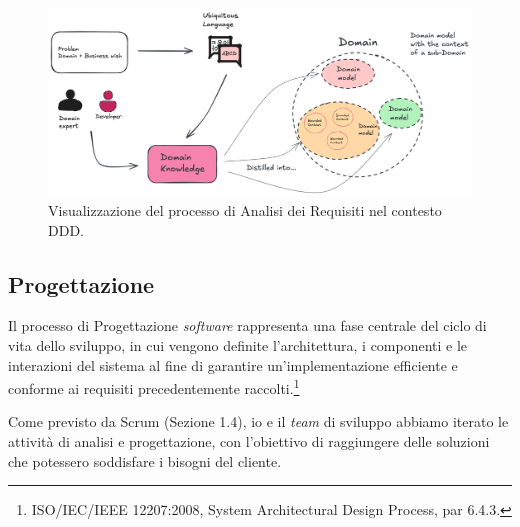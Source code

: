         \begin{figure} [H]
            \centering
            \includegraphics[width=0.9\linewidth]{BCS-Tessi/images/DDD_AR.png}
            \caption[Schema Analisi dei Requisiti nel contesto DDD]{Visualizzazione del processo di Analisi dei Requisiti nel contesto DDD.}
            \label{fig:AR-DDD}
        \end{figure}
        
        \subsection{Progettazione}
        Il processo di Progettazione \textit{software} rappresenta una fase centrale del ciclo di vita dello sviluppo, in cui vengono definite l'architettura, i componenti e le interazioni del sistema al fine di garantire un’implementazione efficiente e conforme ai requisiti precedentemente raccolti.\footnote{ISO/IEC/IEEE 12207:2008, System Architectural Design Process, par 6.4.3.} 
        
        \noindent Come previsto da Scrum (Sezione 1.4), io e il \textit{team} di sviluppo abbiamo iterato le attività di analisi e progettazione, con l'obiettivo di raggiungere delle soluzioni che potessero soddisfare i bisogni del cliente.
        

